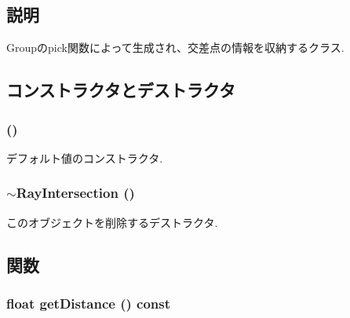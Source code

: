 \subsection{説明}
Groupのpick関数によって生成され、交差点の情報を収納するクラス. 

\subsection{コンストラクタとデストラクタ}
\hypertarget{classm3g_1_1RayIntersection_242b33a79f98ed90ad5a36912d2a46d5}{
\subsubsection[{RayIntersection}]{ ()}}
\label{classm3g_1_1RayIntersection_242b33a79f98ed90ad5a36912d2a46d5}


デフォルト値のコンストラクタ. \hypertarget{classm3g_1_1RayIntersection_bf9eb45cc9ff31acd542bb0da1b46fe1}{
\subsubsection[{$\sim$RayIntersection}]{\setlength{\rightskip}{0pt plus 5cm}$\sim${\bf RayIntersection} ()}}
\label{classm3g_1_1RayIntersection_bf9eb45cc9ff31acd542bb0da1b46fe1}


このオブジェクトを削除するデストラクタ. 

\subsection{関数}
\hypertarget{classm3g_1_1RayIntersection_f024301f51d2ef67cac50e3255a49612}{
\subsubsection[{getDistance}]{\setlength{\rightskip}{0pt plus 5cm}float getDistance () const}}
\label{classm3g_1_1RayIntersection_f024301f51d2ef67cac50e3255a49612}


